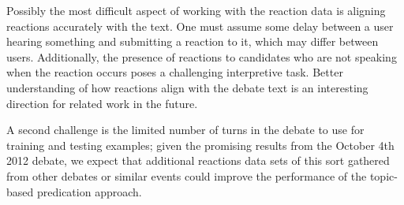 
Possibly the most difficult aspect of working with the reaction data is aligning reactions accurately with the text. One must assume some delay between a user hearing something and submitting a reaction to it, which may differ between users. Additionally, the presence of reactions to candidates who are not speaking when the reaction occurs poses a challenging interpretive task. Better understanding of how reactions align with the debate text is an interesting direction for related work in the future.

A second challenge is the limited number of turns in the debate to use for training and testing examples; given the promising results from the October 4th 2012 debate, we expect that additional reactions data sets of this sort gathered from other debates or similar events could improve the performance of the topic-based predication approach.